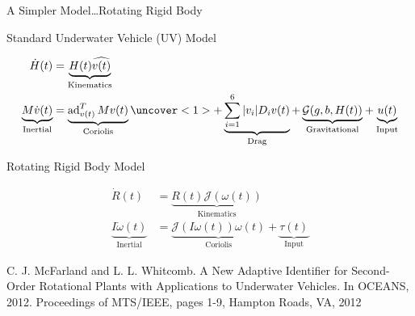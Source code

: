 \begin{frame}[t]{A Simpler Model\dots Rotating Rigid Body}%

Standard Underwater Vehicle (UV) Model
  
  \begin{align} 
   \dot{H}(t)&=\underbrace{H(t)\widehat{v(t)}}_{\text{Kinematics}}
   \nonumber \\
   \underbrace{M\dot{v}(t)}_{\text{Inertial}}&=
   \underbrace{\ad_{v(t)}^TM v(t)}_{\text{Coriolis}}
   \uncover<1>{+\underbrace{\sum_{i=1}^6 |v_i |D_i v(t)}_{\text{Drag}} 
   +\underbrace{\mathcal{G}(g,b,H(t))}_{\text{Gravitational}}}
   +\underbrace{u(t)}_{\text{Input}}
   \nonumber
\end{align}
\pause

Rotating Rigid Body Model

\begin{align} 
    \dot{R}(t)&=\underbrace{R(t)\mathcal{J}(\omega(t))}_{\text{Kinematics}}
    \nonumber \\
    \underbrace{I\dot{\omega}(t)}_{\text{Inertial}}&=\underbrace{\mathcal{J}(I\omega(t))\omega(t)}_{\text{Coriolis}}
    +\underbrace{\tau(t)}_{\text{Input}}
    \nonumber
  \end{align}

  \pause
  
            {\tiny  
                 C. J. McFarland and L. L. Whitcomb. A New Adaptive
                Identifier for Second-Order Rotational Plants with
                 Applications to Underwater Vehicles.  In OCEANS,
                   2012. Proceedings of MTS/IEEE, pages 1-9, Hampton
                 Roads, VA, 2012}


\end{frame}


%
%


